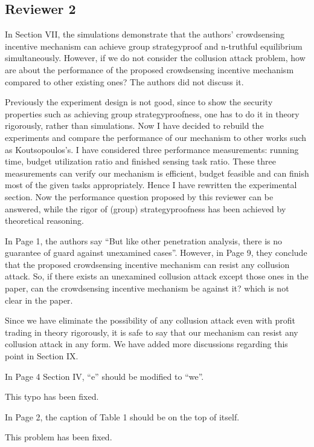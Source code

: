 \documentclass[a4paper,11pt]{exam}
\begin{document}
\begin{questions}
\section{Reviewer 2}
\question In Section VII, the simulations demonstrate that the authors’ crowdsensing incentive mechanism can achieve group strategyproof and n-truthful equilibrium simultaneously. However, if we do not consider the collusion attack problem, how are about the performance of the proposed crowdsensing incentive mechanism compared to other existing ones? The authors did not discuss it.  
\begin{solution}
Previously the experiment design is not good, since to show the security properties such as achieving group strategyproofness, one has to do it in theory rigorously, rather than simulations. Now I have decided to rebuild the experiments and compare the performance of our mechanism to other works such as Koutsopoulos's. I have considered three performance measurements: running time, budget utilization ratio and finished sensing task ratio. These three measurements can verify our mechanism is efficient, budget feasible and can finish most of the given tasks appropriately. Hence I have rewritten the experimental section. Now the performance question proposed by this reviewer can be answered, while the rigor of (group) strategyproofness has been achieved by theoretical reasoning.
\end{solution}

\question In Page 1, the authors say “But like other penetration analysis, there is no guarantee of guard against unexamined cases”. However, in Page 9, they conclude that the proposed crowdsensing incentive mechanism can resist any collusion attack. So, if there exists an unexamined collusion attack except those ones in the paper, can the  crowdsensing incentive mechanism be against it?  which is not clear in the paper.
\begin{solution}
Since we have eliminate the possibility of any collusion attack even with profit trading in theory rigorously, it is safe to say that our mechanism can resist any collusion attack in any form. 
We have added more discussions regarding this point in Section IX.
\end{solution}

\question In Page 4 Section IV, “e” should be modified to “we”.
\begin{solution}
This typo has been fixed.
\end{solution}

\question In Page 2, the caption of Table 1  should be on the top of itself.
\begin{solution}
This problem has been fixed.
\end{solution}


\end{questions}
\end{document}
